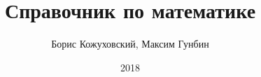 \documentclass[a4paper,12pt]{report}
\begin{document}
\author{Борис Кожуховский, Максим Гунбин}
\title{Справочник по математике}
\date{2018}

\maketitle
\tableofcontents















\printindex %
\end{document}
